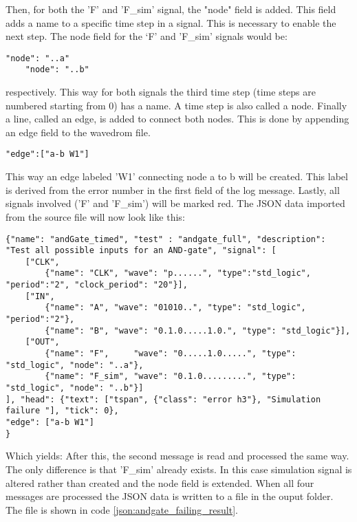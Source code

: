 \npar
Then, for both the 'F' and 'F\_sim' signal, the "node" field is added. This field adds a name to a specific time step in a signal. This is necessary to enable the next step. The node field for the ‘F’ and 'F\_sim' signals would be:
\begin{lstlisting}[style=json]
	"node": "..a"
	"node": "..b"
\end{lstlisting}\noindent
respectively. This way for both signals the third time step (time steps are numbered starting from 0) has a name. A time step is also called a node.
\npar
Finally a line, called an edge, is added to connect both nodes. This is done by appending an edge field to the wavedrom file.
\begin{lstlisting}[style=json]
"edge":["a-b W1"]
\end{lstlisting}\noindent
This way an edge labeled 'W1' connecting node a to b will be created. This label is derived from the error number in the first field of the log message.
\npar
Lastly, all signals involved ('F' and 'F\_sim') will be marked red.
\newpage\noindent
The JSON data imported from the source file will now look like this:
\begin{lstlisting}[style=json, caption={Temporary content of the result file of a failing AND-gate example}, label={json:andgate_failing_part}]
{"name": "andGate_timed", "test" : "andgate_full", "description": "Test all possible inputs for an AND-gate", "signal": [
	["CLK",
		{"name": "CLK", "wave": "p......", "type":"std_logic", "period":"2", "clock_period": "20"}],
	["IN",
		{"name": "A", "wave": "01010..", "type": "std_logic", "period":"2"},
		{"name": "B", "wave": "0.1.0.....1.0.", "type": "std_logic"}],
	["OUT",
		{"name": "F",     "wave": "0.....1.0.....", "type": "std_logic", "node": "..a"},
		{"name": "F_sim", "wave": "0.1.0.........", "type": "std_logic", "node": "..b"}]
], "head": {"text": ["tspan", {"class": "error h3"}, "Simulation failure "], "tick": 0}, 
"edge": ["a-b W1"]
}
\end{lstlisting}\noindent
Which yields:
\nline
After this, the second message is read and processed the same way. The only difference is that 'F\_sim' already exists. In this case simulation signal is altered rather than created and the node field is extended.
\npar
When all four messages are processed the JSON data is written to a file in the  ouput folder. The file is shown in code \ref{json:andgate_failing_result}.

